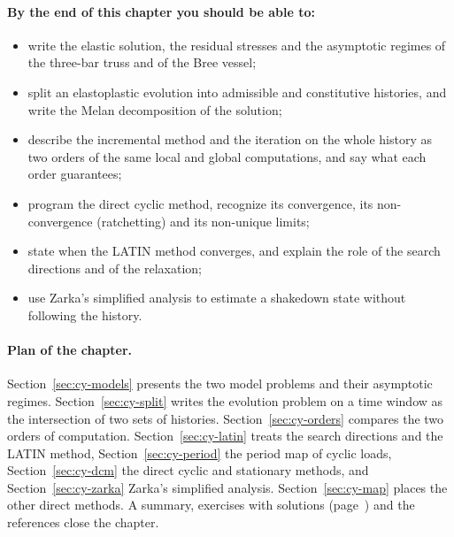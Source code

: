 \paragraph{By the end of this chapter you should be able to:}
\begin{itemize}
  \item write the elastic solution, the residual stresses and the asymptotic
  regimes of the three-bar truss and of the Bree vessel;
  \item split an elastoplastic evolution into admissible and constitutive
  histories, and write the Melan decomposition of the solution;
  \item describe the incremental method and the iteration on the whole history
  as two orders of the same local and global computations, and say what each
  order guarantees;
  \item program the direct cyclic method, recognize its convergence, its
  non-convergence (ratchetting) and its non-unique limits;
  \item state when the LATIN method converges, and explain the
  role of the search directions and of the relaxation;
  \item use Zarka's simplified analysis to estimate a shakedown state without
  following the history.
\end{itemize}

\paragraph{Plan of the chapter.} Section~\ref{sec:cy-models} presents the two
model problems and their asymptotic regimes. Section~\ref{sec:cy-split}
writes the evolution problem on a time window as the intersection of two sets
of histories. Section~\ref{sec:cy-orders} compares the two orders of
computation. Section~\ref{sec:cy-latin} treats the search directions and the
LATIN method, Section~\ref{sec:cy-period} the period map of cyclic loads,
Section~\ref{sec:cy-dcm} the direct cyclic and stationary methods, and
Section~\ref{sec:cy-zarka} Zarka's simplified analysis.
Section~\ref{sec:cy-map} places the other direct methods. A summary,
exercises with solutions (page~\pageref{sec:cy-exo}) and the references close
the chapter.

